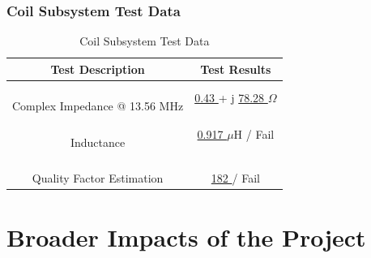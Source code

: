 \documentclass[12pt]{article}
\begin{document}
\subsubsection{Coil Subsystem Test Data}
\hfill
\begin{table}[h!]
\centering
\caption*{Coil Subsystem Test Data}
\begin{tabular}{ | c | c | }
\hline
\textbf{Test Description} & \textbf{Test Results} \\
\hline
\parbox{0.5\linewidth}{\raggedright \hfill \\[-0.25 em]
Complex Impedance @ 13.56 MHz
\hfill \\[0.1 em]} &  \parbox{0.4\linewidth}{\raggedright \hfill \\ [0.7 em]\underline{\hspace{0.125in}
0.43
\hspace{0.125in}} + j
\underline{\hspace{0.125in}
78.28
\hspace{0.125in}} $\Omega$
\hfill \\ [0.3 em]} \\ 
\hline
\parbox{0.5\linewidth}{\raggedright \hfill \\[-0.25 em]
Inductance
\hfill \\[0.1 em]} &  \parbox{0.4\linewidth}{\raggedright \hfill \\ [0.7 em]\underline{\hspace{0.125in}
0.917
\hspace{0.125in}} $\mu$H
\hspace{0.125 in} / \space  Fail \hfill \\ [0.3 em]} \\ 
\hline
\parbox{0.5\linewidth}{\raggedright \hfill \\[-0.25 em]
Quality Factor Estimation
\hfill \\[0.1 em]} &  \parbox{0.4\linewidth}{\raggedright \hfill \\ [0.7 em]\underline{\hspace{0.125in}
182
\hspace{0.125in}} \hspace{0.125 in} / \space  Fail \hfill \\ [0.3 em]} \\ 
\hline
\end{tabular}
\end{table}
\hfill
\section{Broader Impacts of the Project}
\end{document}

